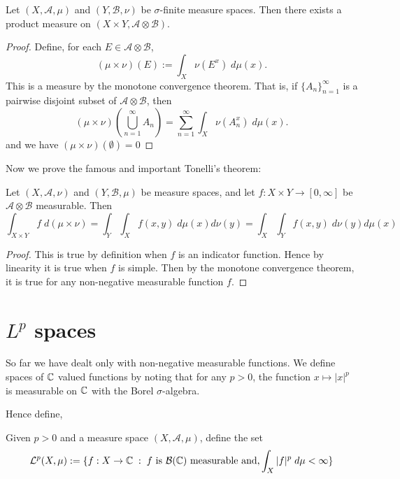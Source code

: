 \documentclass{owmaths}
\begin{document}
\begin{proposition}
    Let $(X,\mathcal{A},\mu)$ and $(Y,\mathcal{B},\nu)$ be $\sigma$-finite
    measure spaces. Then there exists a product measure on $(X\times Y,\mathcal{A}\otimes \mathcal{B})$.
\end{proposition}
\begin{proof}
    Define, for each $E \in \mathcal{A}\otimes \mathcal{B}$,
    \begin{equation*}
        (\mu\times\nu)(E) := \int_X \nu(E^x)\;d\mu(x).        
    \end{equation*}
    This is a measure by the monotone convergence theorem. That is, if $\{A_n\}_{n=1}^\infty$
    is a pairwise disjoint subset of $\mathcal{A}\otimes\mathcal{B}$, then
    \begin{equation*}
        (\mu\times\nu)\left(\bigcup_{n=1}^\infty A_n\right) = \sum_{n=1}^\infty \int_{X} \nu(A_n^x)\;d\mu(x).
    \end{equation*}
    and we have $(\mu\times\nu)(\emptyset) = 0$
\end{proof}

Now we prove the famous and important Tonelli's theorem:
\begin{proposition}
    Let $(X,\mathcal{A},\nu)$ and $(Y,\mathcal{B},\mu)$ be measure spaces,
    and let $f:X\times Y\rightarrow[0,\infty]$ be $\mathcal{A}\otimes\mathcal{B}$
    measurable. Then
    \begin{equation*}
        \int_{X\times Y} f\;d(\mu\times\nu) = \int_Y \int_X f(x,y)\;d\mu(x)d\nu(y) = \int_X \int_Y f(x,y)\; d\nu(y)d\mu(x)
    \end{equation*}
\end{proposition}
\begin{proof}
    This is true by definition when $f$ is an indicator function. Hence by linearity
    it is true when $f$ is simple. Then by the monotone convergence theorem,
    it is true for any non-negative measurable function $f$.
\end{proof}

\section{$L^p$ spaces}
So far we have dealt only with non-negative measurable functions. We define
spaces of $\mathbb{C}$ valued functions by noting that for any $p > 0$, the function
$x\mapsto |x|^p$ is measurable on $\mathbb{C}$ with the Borel $\sigma$-algebra.

Hence define,
\begin{definition}
    Given $p > 0$ and a measure space $(X,\mathcal{A},\mu)$, define the set
    \begin{equation*}
        \mathcal{L}^p(X,\mu) := \{f:X\rightarrow\mathbb{C}\;:\;f\text{ is }\mathcal{B}(\mathbb{C})\text{ measurable and},\int_X |f|^p\;d\mu < \infty\}
    \end{equation*}
\end{definition}
\end{document}
